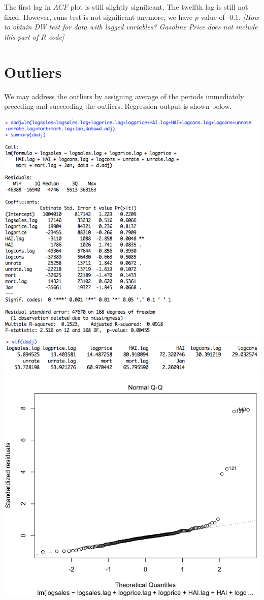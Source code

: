 \documentclass[a4 paper, 11 pt]{article}
\begin{document}
The first lag in $ACF$ plot is still slightly significant. The twelfth lag is still not fixed. However, runs test is not significant anymore, we have $p$-value of -0.1. \textit{[How to obtain DW test for data with lagged variables? Gasoline Price does not include this part of $R$ code]}

\section{Outliers}
We may address the outliers by assigning average of the periods immediately preceding and succeeding the outliers. Regression output is shown below.
\begin{center}
\includegraphics[scale=0.4]{flm}
\includegraphics[scale=0.5]{fvif}
\includegraphics[scale=0.4]{fqq}

\end{center}
\end{document}
